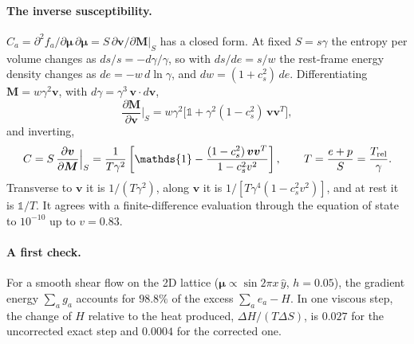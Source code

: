\documentclass[11pt,aps,preprint,nofootinbib,superscriptaddress,tightenlines]{revtex4-2}
\def\st{\begin{equation}}
\def\stp{\end{equation}}
\newcommand{\one}{\mathds{1}}
\let\oldparagraph\paragraph
\renewcommand{\paragraph}{\par\bigskip\oldparagraph}
\begin{document}
\paragraph{The inverse susceptibility.}  $C_a=\partial^2f_a/\partial\bm\mu\,\partial\bm\mu
=S\,\partial\bm v/\partial\bm M|_S$ has a closed form.  At fixed $S=s\gamma$ the
entropy per volume changes as $ds/s=-d\gamma/\gamma$, so with $ds/de=s/w$ the
rest-frame energy density changes as $de=-w\,d\ln\gamma$, and $dw=(1+c_s^2)\,de$.
Differentiating $\bm M=w\gamma^2\bm v$, with $d\gamma=\gamma^3\,\bm v\cdot d\bm v$,
\st
\frac{\partial\bm M}{\partial\bm v}\Big|_S=w\gamma^2\big[\one+\gamma^2(1-c_s^2)\,\bm v\bm v^T\big],
\stp
and inverting,
\st
C=S\,\frac{\partial\bm v}{\partial\bm M}\Big|_S
=\frac{1}{T\gamma^2}\left[\one-\frac{(1-c_s^2)\,\bm v\bm v^T}{1-c_s^2v^2}\right],
\qquad T=\frac{e+p}{S}=\frac{T_{\rm rel}}{\gamma} .
\label{Canalytic}
\stp
Transverse to $\bm v$ it is $1/(T\gamma^2)$, along $\bm v$ it is
$1/[T\gamma^4(1-c_s^2v^2)]$, and at rest it is $\one/T$.  It agrees with a
finite-difference evaluation through the equation of state to $10^{-10}$ up to
$v=0.83$.

\paragraph{A first check.}  For a smooth shear flow on the 2D lattice
($\bm\mu\propto\sin2\pi x\,\hat y$, $h=0.05$), the gradient energy $\sum_ag_a$
accounts for $98.8\%$ of the excess $\sum_ae_a-H$.  In one viscous step, the
change of $H$ relative to the heat produced, $\Delta H/(T\Delta S)$, is $0.027$ for
the uncorrected exact step and $0.0004$ for the corrected one.
\end{document}
